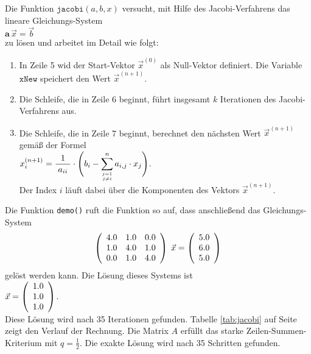 \noindent
Die Funktion $\mathtt{jacobi}(a,b,x)$ versucht, mit Hilfe des Jacobi-Verfahrens das lineare
Gleichungs-System 
\\[0.2cm]
\hspace*{1.3cm}
$\textbf{a}\, \vec{x} = \vec{b}$
\\[0.2cm]
zu l\"osen und arbeitet im Detail wie folgt:
\begin{enumerate}
\item In Zeile 5 wid der Start-Vektor $\vec{x}^{(0)}$ als Null-Vektor definiert.
      Die Variable $\mathtt{xNew}$ speichert den Wert $\vec{x}^{(n+1)}$. 
\item Die Schleife, die in Zeile 6 beginnt, f\"uhrt insgesamt $k$ Iterationen des Jacobi-Verfahrens aus.
\item Die Schleife, die in Zeile 7 beginnt, berechnet den n\"achsten Wert $\vec{x}^{(n+1)}$
      gem\"a{\ss} der Formel
      \\[0.2cm]
      \hspace*{1.3cm}
      $x^{(n+1)}_i = 
       \displaystyle\frac{\;\displaystyle1\;}{\;\displaystyle a_{ii}\;} \cdot  \Biggl( b_i - \sum\limits_{j=1 \atop j \not= i}^n a_{i,j} \cdot x_j \Biggr)
      $.   
      \\[0.2cm]
      Der Index $i$ l\"auft dabei \"uber die Komponenten des Vektors $\vec{x}^{(n+1)}$.
\end{enumerate}
Die Funktion \texttt{demo()} ruft die Funktion so auf, dass anschlie{\ss}end
das Gleichungs-System
\[
\left(\begin{array}[c]{lll}
  4.0 & 1.0 & 0.0 \\
  1.0 & 4.0 & 1.0 \\
  0.0 & 1.0 & 4.0 
\end{array}\right) \;\vec{x} =
\left(\begin{array}[c]{l}
  5.0 \\ 
  6.0 \\
  5.0
\end{array}\right)
\]
gel\"ost werden kann.  Die L\"osung dieses Systems ist
\\[0.2cm]
\hspace*{1.3cm}
 $\vec{x} =
\left(\begin{array}[c]{l}
  1.0 \\
  1.0 \\
  1.0
\end{array}\right)$.  
\\[0.2cm]
Diese L\"osung wird nach 35 Iterationen gefunden.
Tabelle \ref{tab:jacobi} auf Seite \pageref{tab:jacobi} zeigt den Verlauf der Rechnung.
Die Matrix $A$ erf\"ullt das starke Zeilen-Summen-Kriterium mit $q = \frac{1}{2}$.  Die exakte L\"osung wird
nach 35 Schritten gefunden.



